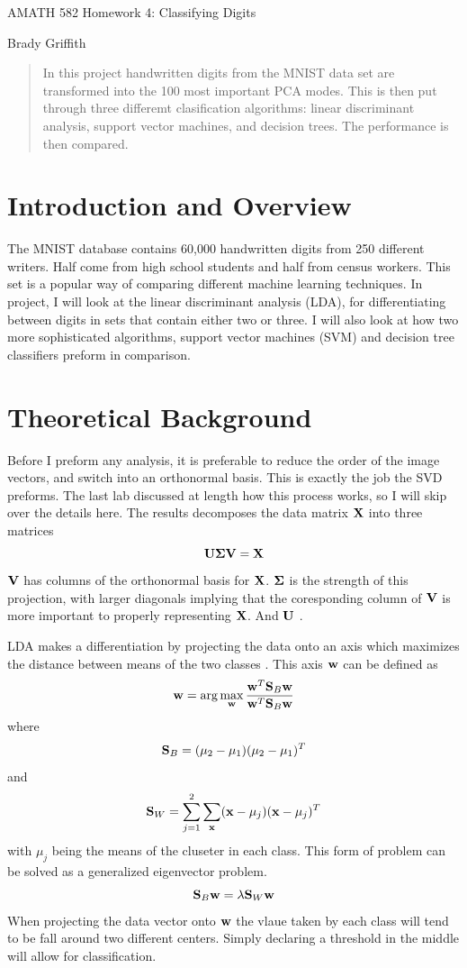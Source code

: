 \documentclass{article}
\begin{document}
    \begin{center}
        \Large AMATH 582 Homework 4: Classifying Digits \par
        \large Brady Griffith
    \end{center}

    \begin{abstract}
        In this project handwritten digits from the MNIST data set are
        transformed into the 100 most important PCA modes. This is then put
        through three differemt clasification algorithms: linear discriminant
        analysis, support vector machines, and decision trees. The performance
        is then compared.
    \end{abstract}

    \section{Introduction and Overview}
    The MNIST database contains 60,000 handwritten digits from 250 different
    writers. Half come from high school students and half from census workers.
    This set is a popular way of comparing different machine learning
    techniques. In project, I will look at the linear discriminant analysis
    (LDA), for differentiating between digits in sets that contain either two or
    three. I will also look at how two more sophisticated algorithms, support
    vector machines (SVM) and decision tree classifiers preform in comparison.

    \section{Theoretical Background}
    Before I preform any analysis, it is preferable to reduce the order of the
    image vectors, and switch into an orthonormal basis. This is exactly the job
    the SVD preforms. The last lab discussed at length how this process works,
    so I will skip over the details here. The results decomposes the data matrix
    $\vb{X}$ into three matrices
    $$ \vb{U} \vb*{\Sigma} \vb{V} = \vb{X} $$
    $\vb{V}$ has columns of the orthonormal basis for $\vb{X}$. $\vb*{\Sigma}$
    is the strength of this projection, with larger diagonals implying that the
    coresponding column of $\vb{V}$ is more important to properly representing
    $\vb{X}$. And $\vb{U}$ .

    LDA makes a differentiation by projecting the data onto an axis which
    maximizes the distance between means of the two classes \cite{Kutz2013}.
    This axis $\vb{w}$ can be defined as
    $$\vb{w} = \arg \max_{\vb{w}}
    \frac{\vb{w}^T \vb{S}_B \vb{w}}{\vb{w}^T \vb{S}_B \vb{w}} $$
    where
    $$ \vb{S}_B = (\mu_2 - \mu_1)(\mu_2 - \mu_1)^T $$
    and
    $$ \vb{S}_W = \sum_{j=1}^2 \sum_{\vb{x}} (\vb{x} - \mu_j)(\vb{x} - \mu_j)^T $$
    with $\mu_j$ being the means of the cluseter in each class. This form of
    problem can be solved as a generalized eigenvector problem.
    $$ \vb{S}_B \vb{w} = \lambda \vb{S}_W \vb{w}$$
    When projecting the data vector onto $\vb{w}$ the vlaue taken by each class
    will tend to be fall around two different centers. Simply declaring a
    threshold in the middle will allow for classification.
\end{document}
